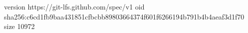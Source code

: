 version https://git-lfs.github.com/spec/v1
oid sha256:c6cd1fb9baa431851cfbcbb89803664374f601f6266194b791b4b4aeaf3d1f70
size 10972
